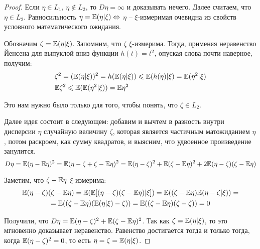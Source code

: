 \begin{proof}
    Если $\eta \in L_1$, $\eta \not\in L_2$, то $D\eta = \infty$ и доказывать нечего. Далее считаем, что $\eta \in L_2$. Равносильность $\eta = \mathbb{E}(\eta | \xi) \Leftrightarrow$ $\eta$ -- $\xi$-измеримая очевидна из свойств условного математического ожидания.

    Обозначим $\zeta = \mathbb{E}(\eta | \xi)$. Запомним, что $\zeta$ $\xi$-измерима. Тогда, применяя неравенство Йенсена для выпуклой вниз функции $h(t) = t^2$, опуская слова почти наверное, получим:
    \begin{align*}
        & \zeta^2 = (\mathbb{E}(\eta | \xi))^2 = h(\mathbb{E}(\eta | \xi)) \leqslant \mathbb{E}(h(\eta) | \xi) = \mathbb{E}(\eta^2 | \xi)
        \\
        & \mathbb{E} \zeta^2 \leqslant \mathbb{E}(\mathbb{E}(\eta^2 | \xi)) = \mathbb{E} \eta^2 
    \end{align*}

    Это нам нужно было только для того, чтобы понять, что $\zeta \in L_2$.
    
    Далее идея состоит в следующем: добавим и вычтем в разность внутри дисперсии $\eta$ случайную величину $\zeta$, которая является частичным матожиданием $\eta$, потом раскроем, как сумму квадратов, и выясним, что удвоенное произведение занулится.
    \[
        D\eta = \mathbb{E}(\eta - \mathbb{E}\eta)^2 = \mathbb{E}(\eta - \zeta + \zeta - \mathbb{E}\eta)^2 = \mathbb{E}(\eta - \zeta)^2 + \mathbb{E}(\zeta - \mathbb{E}\eta)^2 + 2 \mathbb{E}(\eta-\zeta)(\zeta-\mathbb{E}\eta)
    \]

    Заметим, что $\zeta-\mathbb{E}\eta$ $\xi$-измерима:
    \begin{multline*}
        \mathbb{E}(\eta-\zeta)(\zeta-\mathbb{E}\eta) = \mathbb{E}(\mathbb{E}[(\eta-\zeta)(\zeta-\mathbb{E}\eta) | \xi]) = \mathbb{E}((\zeta-\mathbb{E}\eta) \mathbb{E}(\eta-\zeta | \xi)) =
        \\
        = \mathbb{E}((\zeta-\mathbb{E}\eta) (\mathbb{E}(\eta | \xi) - \zeta)) = \mathbb{E}((\zeta-\mathbb{E}\eta) (\zeta - \zeta)) = 0
    \end{multline*}

    Получили, что $D\eta = \mathbb{E}(\eta - \zeta)^2 + \mathbb{E}(\zeta - \mathbb{E}\eta)^2$. Так как $\zeta = \mathbb{E}(\eta | \xi)$, то это мгновенно доказывает неравенство. Равенство достигается тогда и только тогда, когда $\mathbb{E}(\eta - \zeta)^2 = 0$, то есть $\eta = \zeta = \mathbb{E}(\eta | \xi)$.    
\end{proof}

